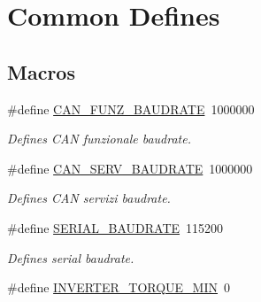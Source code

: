 \hypertarget{group___common__defines__group}{}\section{Common Defines}
\label{group___common__defines__group}
\subsection*{Macros}
\begin{DoxyCompactItemize}
\item 
\mbox{\label{group___common__defines__group_gadee7e3800c996a5a977034531d94570d}} 
\#define \mbox{\hyperlink{group___common__defines__group_gadee7e3800c996a5a977034531d94570d}{C\+A\+N\+\_\+\+F\+U\+N\+Z\+\_\+\+B\+A\+U\+D\+R\+A\+TE}}~1000000
\begin{DoxyCompactList}\small\item\em Defines C\+AN funzionale baudrate. \end{DoxyCompactList}\item 
\mbox{\label{group___common__defines__group_ga2a5e84dfc7fa972b75e7ddbc6cc52a45}} 
\#define \mbox{\hyperlink{group___common__defines__group_ga2a5e84dfc7fa972b75e7ddbc6cc52a45}{C\+A\+N\+\_\+\+S\+E\+R\+V\+\_\+\+B\+A\+U\+D\+R\+A\+TE}}~1000000
\begin{DoxyCompactList}\small\item\em Defines C\+AN servizi baudrate. \end{DoxyCompactList}\item 
\mbox{\label{group___common__defines__group_ga89f82a9d44beaa52b00c7245a50a105c}} 
\#define \mbox{\hyperlink{group___common__defines__group_ga89f82a9d44beaa52b00c7245a50a105c}{S\+E\+R\+I\+A\+L\+\_\+\+B\+A\+U\+D\+R\+A\+TE}}~115200
\begin{DoxyCompactList}\small\item\em Defines serial baudrate. \end{DoxyCompactList}\item 
\mbox{\label{group___common__defines__group_ga88b70295d519fa0e69facb9837567b2f}} 
\#define \mbox{\hyperlink{group___common__defines__group_ga88b70295d519fa0e69facb9837567b2f}{I\+N\+V\+E\+R\+T\+E\+R\+\_\+\+T\+O\+R\+Q\+U\+E\+\_\+\+M\+IN}}~0

\end{DoxyCompactItemize}
